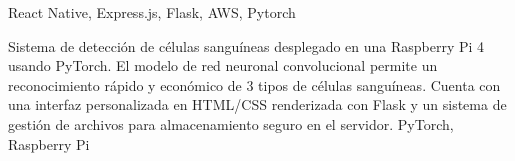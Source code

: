 %
%
%

\begin{projects}
     {React Native, Express.js, Flask, AWS, Pytorch}

     {Sistema de detección de células sanguíneas desplegado en una Raspberry Pi 4 usando PyTorch. El modelo de red neuronal convolucional permite un reconocimiento rápido y económico de 3 tipos de células sanguíneas. Cuenta con una interfaz personalizada en HTML/CSS renderizada con Flask y un sistema de gestión de archivos para almacenamiento seguro en el servidor.} {PyTorch, Raspberry Pi}
\end{projects}